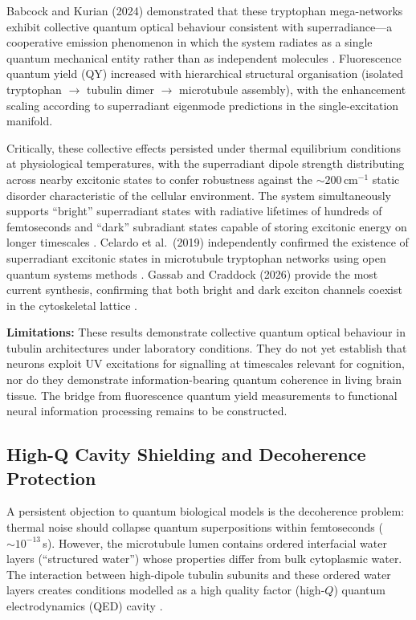 \documentclass[10pt, a4paper, twocolumn]{article}
\begin{document}
Babcock and Kurian (2024) demonstrated that these tryptophan
mega-networks exhibit collective quantum optical behaviour consistent
with superradiance---a cooperative emission phenomenon in which the
system radiates as a single quantum mechanical entity rather than as
independent molecules \cite{babcock2024}. Fluorescence quantum yield
(QY) increased with hierarchical structural organisation (isolated
tryptophan $\to$ tubulin dimer $\to$ microtubule assembly), with the
enhancement scaling according to superradiant eigenmode predictions in
the single-excitation manifold.

Critically, these collective effects persisted under thermal equilibrium
conditions at physiological temperatures, with the superradiant dipole
strength distributing across nearby excitonic states to confer robustness
against the $\sim200$\,cm$^{-1}$ static disorder characteristic of the
cellular environment. The system simultaneously supports ``bright''
superradiant states with radiative lifetimes of hundreds of
femtoseconds and ``dark'' subradiant states capable of storing excitonic
energy on longer timescales \cite{babcock2024}. Celardo et al.\ (2019)
independently confirmed the existence of superradiant excitonic states
in microtubule tryptophan networks using open quantum systems methods
\cite{celardo2019}. Gassab and Craddock (2026) provide the most current
synthesis, confirming that both bright and dark exciton channels coexist
in the cytoskeletal lattice \cite{gassab2026}.

{\samepage
\textbf{Limitations:} These results demonstrate collective quantum
optical behaviour in tubulin architectures under laboratory conditions.
They do not yet establish that neurons exploit UV excitations for
signalling at timescales relevant for cognition, nor do they demonstrate
information-bearing quantum coherence in living brain tissue. The bridge
from fluorescence quantum yield measurements to functional neural
information processing remains to be constructed.\par}

\subsection{High-Q Cavity Shielding and Decoherence Protection}

A persistent objection to quantum biological models is the decoherence
problem: thermal noise should collapse quantum superpositions within
femtoseconds ($\sim10^{-13}$\,s). However, the microtubule lumen
contains ordered interfacial water layers (``structured water'') whose
properties differ from bulk cytoplasmic water. The interaction between
high-dipole tubulin subunits and these ordered water layers creates
conditions modelled as a high quality factor (high-$Q$) quantum
electrodynamics (QED) cavity \cite{hameroff2014}.
\end{document}
